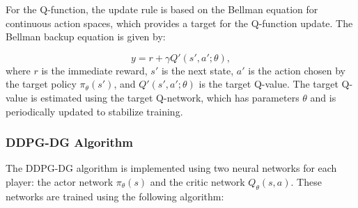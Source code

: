 \documentclass[conference]{IEEEtran}
\begin{document}
For the Q-function, the update rule is based on the Bellman equation for continuous action spaces, which provides a target for the Q-function update. The Bellman backup equation is given by:

\begin{equation}
    y = r + \gamma Q'(s', a'; \theta),
\end{equation}
where \( r \) is the immediate reward, \( s' \) is the next state, \( a' \) is the action chosen by the target policy \( \pi_{\theta}(s') \), and \( Q'(s', a'; \theta) \) is the target Q-value. The target Q-value is estimated using the target Q-network, which has parameters \( \theta \) and is periodically updated to stabilize training.

\subsubsection{DDPG-DG Algorithm}

The DDPG-DG algorithm is implemented using two neural networks for each player: the actor network \( \pi_{\theta}(s) \) and the critic network \( Q_{\theta}(s, a) \). These networks are trained using the following algorithm:
\end{document}
